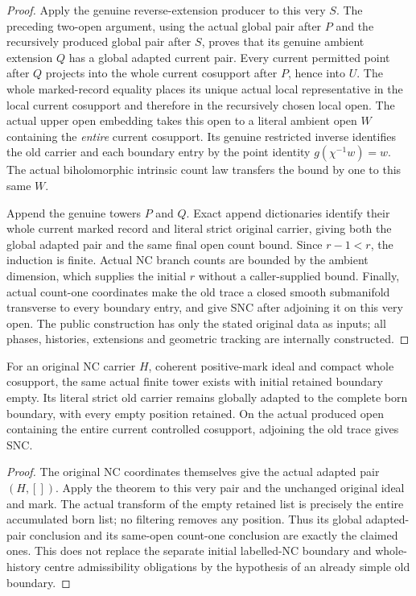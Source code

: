 \begin{proof}
Apply the genuine reverse-extension producer to this very $S$. The
preceding two-open argument, using the actual global pair after $P$ and
the recursively produced global pair after $S$, proves that its genuine
ambient extension $Q$ has a global adapted current pair. Every current
permitted point after $Q$ projects into the whole current cosupport
after $P$, hence into $U$. The whole marked-record equality places its
unique actual local representative in the local current cosupport and
therefore in the recursively chosen local open. The actual upper open
embedding takes this open to a literal ambient open $W$ containing the
\emph{entire} current cosupport. Its genuine restricted inverse
identifies the old carrier and each boundary entry by the point identity
$g(\chi^{-1}w)=w$. The actual biholomorphic intrinsic count law transfers
the bound by one to this same $W$.

Append the genuine towers $P$ and $Q$. Exact append dictionaries
identify their whole current marked record and literal strict original
carrier, giving both the global adapted pair and the same final open
count bound. Since $r-1<r$, the induction is finite. Actual NC branch
counts are bounded by the ambient dimension, which supplies the initial
$r$ without a caller-supplied bound. Finally, actual count-one
coordinates make the old trace a closed smooth submanifold transverse
to every boundary entry, and give SNC after adjoining it on this very
open. The public construction has only the stated original data as
inputs; all phases, histories, extensions and geometric tracking are
internally constructed.
\end{proof}

\begin{corollary}
\label{hir:nc-original-empty-retained-global-finite-prephase}
\leanok
For an original NC carrier $H$, coherent positive-mark ideal and compact
whole cosupport, the same actual finite tower exists with initial
retained boundary empty. Its literal strict old carrier remains globally
adapted to the complete born boundary, with every empty position
retained. On the actual produced open containing the entire current
controlled cosupport, adjoining the old trace gives SNC.
\end{corollary}
\begin{proof}
The original NC coordinates themselves give the actual adapted pair
$(H,[])$. Apply the theorem to this very pair and the unchanged original
ideal and mark. The actual transform of the empty retained list is
precisely the entire accumulated born list; no filtering removes any
position. Thus its global adapted-pair conclusion and its same-open
count-one conclusion are exactly the claimed ones. This does not replace
the separate initial labelled-NC boundary and whole-history centre
admissibility obligations by the hypothesis of an already simple old
boundary.
\end{proof}
